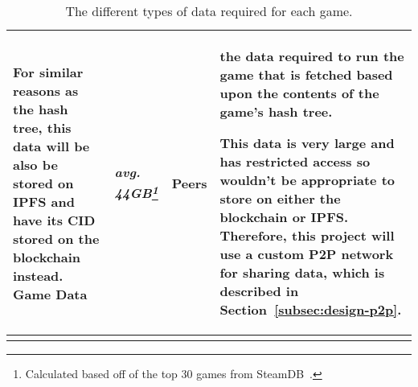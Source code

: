\begin{longtable}{ p{} p{} p{} p{} }
  \vspace{1mm}
  \small For similar reasons as the hash tree, this data will be also be stored on IPFS and have its CID stored on the blockchain instead.
  \x
  Game Data
  & \textit{avg. 44GB\footnote{Calculated based off of the top 30 games from SteamDB~\cite{noauthor_steam_nodate}.}}
  & Peers
  & the data required to run the game that is fetched based upon the contents of the game's hash tree.

  \vspace{1mm}
  \small This data is very large and has restricted access so wouldn't be appropriate to store on either the blockchain or IPFS. Therefore, this project will use a custom P2P network for sharing data, which is described in Section~\ref{subsec:design-p2p}.
  \\\bottomrule\bottomrule
  \caption{The different types of data required for each game.}
  \label{tab:data}
\end{longtable}
